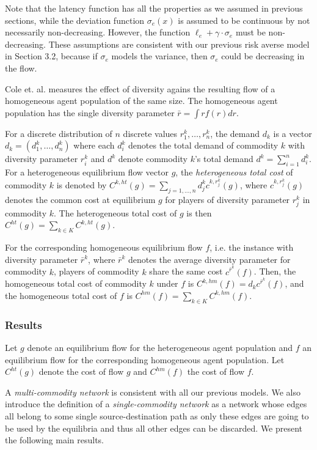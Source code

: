Note that the latency function has all the properties as we assumed in previous sections, while the deviation function $\sigma_e(x)$ is assumed to be continuous by not necessarily non-decreasing. However, the function $\ell_e+\gamma\cdot \sigma_e$ must be non-decreasing. These assumptions are consistent with our previous risk averse model in Section 3.2, because if $\sigma_e$ models the variance, then $\sigma_e$ could be decreasing in the flow.

Cole et. al. measures the effect of diversity agains the resulting flow of a homogeneous agent population of the same size. The homogeneous agent population has the single diversity parameter $\bar{r}=\int rf(r)d r$. 

For a discrete distribution of $n$ discrete values $r_1^k, \dots, r_n^k$, the demand $d_k$ is a vector $d_k=(d_1^k, \dots, d_n^k)$ where each $d_i^k$ denotes the total demand of commodity $k$ with diversity parameter $r_i^k$ and $d^k$ denote commodity $k$'s total demand $d^k=\sum_{i=1}^n d_i^k$. For a heterogeneous equilibrium flow vector $g$, the {\it heterogeneous total cost} of commodity $k$ is denoted by $C^{k,ht}(g)=\sum_{j=1,\dots, n} d_j^k c^{k, r_j^k}(g)$, where $c^{k, r_j^k}(g)$ denotes the common cost at equilibrium $g$ for players of diversity parameter $r_j^k$ in commodity $k$. The heterogeneous total cost of $g$ is then $C^{ht}(g)=\sum_{k\in K} C^{k,ht}(g)$. 

For the corresponding homogeneous equilibrium flow $f$, i.e. the instance with diversity parameter $\bar{r}^k$, where $\bar{r}^k$ denotes the average diversity parameter for commodity $k$, players of commodity $k$ share the same cost $c^{\bar{r}^k}(f)$. Then, the homogeneous total cost of commodity $k$ under $f$ is $C^{k,hm}(f)=d_kc^{\bar{r}^k}(f)$, and the homogeneous total cost of $f$ is $C^{hm}(f)=\sum_{k\in K} C^{k,hm}(f)$. 


\subsubsection{Results}
Let $g$ denote an equilibrium flow for the heterogeneous agent population and $f$ an equilibrium flow for the corresponding homogeneous agent population. Let $C^{ht}(g)$ denote the cost of flow $g$ and $C^{hm}(f)$ the cost of flow $f$. 

A {\it multi-commodity network} is consistent with all our previous models. We also introduce the definition of a {\it single-commodity network} as a network whose edges all belong to some single source-destination path as only these edges are going to be used by the equilibria and thus all other edges can be discarded. We present the following main results.

